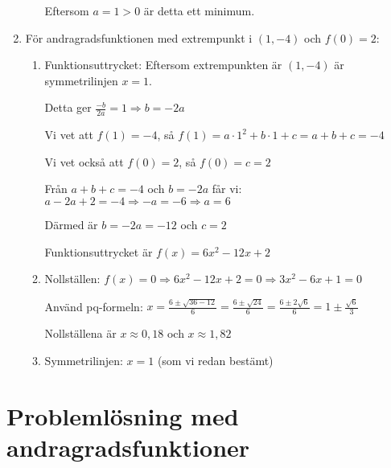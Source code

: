 \documentclass[a4paper,11pt]{article}
\begin{document}
\begin{enumerate}[label=\textbf{\arabic*.}]
\begin{enumerate}[label=\alph*)]
        Eftersom $a = 1 > 0$ är detta ett minimum.
    \end{enumerate}
    
    \item För andragradsfunktionen med extrempunkt i $(1, -4)$ och $f(0) = 2$:
    \begin{enumerate}[label=\alph*)]
        \item Funktionsuttrycket: Eftersom extrempunkten är $(1, -4)$ är symmetrilinjen $x = 1$.
        
        Detta ger $\frac{-b}{2a} = 1 \Rightarrow b = -2a$
        
        Vi vet att $f(1) = -4$, så $f(1) = a \cdot 1^2 + b \cdot 1 + c = a + b + c = -4$
        
        Vi vet också att $f(0) = 2$, så $f(0) = c = 2$
        
        Från $a + b + c = -4$ och $b = -2a$ får vi: $a - 2a + 2 = -4 \Rightarrow -a = -6 \Rightarrow a = 6$
        
        Därmed är $b = -2a = -12$ och $c = 2$
        
        Funktionsuttrycket är $f(x) = 6x^2 - 12x + 2$
        
        \item Nollställen: $f(x) = 0 \Rightarrow 6x^2 - 12x + 2 = 0 \Rightarrow 3x^2 - 6x + 1 = 0$
        
        Använd pq-formeln: $x = \frac{6 \pm \sqrt{36-12}}{6} = \frac{6 \pm \sqrt{24}}{6} = \frac{6 \pm 2\sqrt{6}}{6} = 1 \pm \frac{\sqrt{6}}{3}$
        
        Nollställena är $x \approx 0,18$ och $x \approx 1,82$
        
        \item Symmetrilinjen: $x = 1$ (som vi redan bestämt)
    \end{enumerate}
\end{enumerate}

\section{Problemlösning med andragradsfunktioner}
\end{document}
